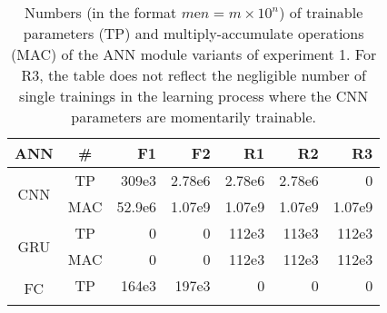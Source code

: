 \providecommand{\ncols}{}\renewcommand{\ncols}{7}
\begin{table}[h]
    \caption[
        Trainable parameters and MAC operations of experiment 1
    ]{
        Numbers (in the format $m\text{e}n = m\times 10^n$) of trainable parameters (TP)
        and multiply-accumulate operations (MAC)
        of the ANN module variants of experiment 1.
        For R3, the table does not reflect 
        the negligible number of single trainings 
        in the learning process
        where the CNN parameters are momentarily trainable.
        \label{tab:exp1_nums}}        
    \centering
    \begin{tabular}{|c|c|r|r|r|r|r|} 
        \hline
        ANN
        &\#
        &F1
        &F2
        &R1
        &R2
        &R3
        \\\hline\hline
        \multirow{2}{*}{CNN}
        &TP
        &309e3
        &2.78e6
        &2.78e6
        &2.78e6
        &0
        \\\cline{2-\ncols}
        &MAC
        &52.9e6
        &1.07e9
        &1.07e9
        &1.07e9
        &1.07e9
        \\\hline
        \multirow{2}{*}{GRU}
        &TP
        &0
        &0
        &112e3
        &113e3
        &112e3
        \\\cline{2-\ncols}
        &MAC
        &0
        &0
        &112e3
        &112e3
        &112e3
        \\\hline
        \multirow{2}{*}{FC}
        &TP
        &164e3
        &197e3
        &0
        &0
        &0
        \\\cline{2-\ncols}

\end{tabular}
\end{table}
